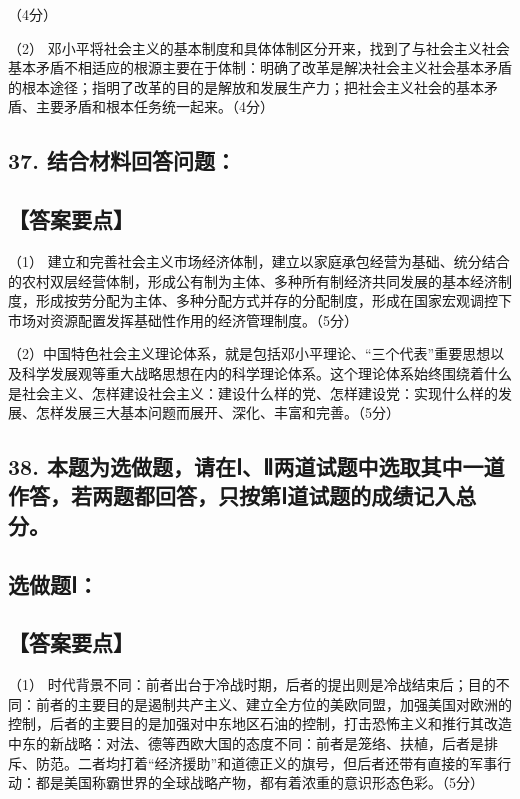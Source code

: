 \documentclass[UTF8,11pt]{ctexart}
\begin{document}
（4分）


（2） 邓小平将社会主义的基本制度和具体体制区分开来，找到了与社会主义社会基本矛盾不相适应的根源主要在于体制：明确了改革是解决社会主义社会基本矛盾的根本途径；指明了改革的目的是解放和发展生产力；把社会主义社会的基本矛盾、主要矛盾和根本任务统一起来。（4分）


\subsection*{37. 结合材料回答问题：}

\subsection*{【答案要点】}

（1） 建立和完善社会主义市场经济体制，建立以家庭承包经营为基础、统分结合的农村双层经营体制，形成公有制为主体、多种所有制经济共同发展的基本经济制度，形成按劳分配为主体、多种分配方式并存的分配制度，形成在国家宏观调控下市场对资源配置发挥基础性作用的经济管理制度。（5分）


（2）中国特色社会主义理论体系，就是包括邓小平理论、“三个代表”重要思想以及科学发展观等重大战略思想在内的科学理论体系。这个理论体系始终围绕着什么是社会主义、怎样建设社会主义：建设什么样的党、怎样建设党：实现什么样的发展、怎样发展三大基本问题而展开、深化、丰富和完善。（5分）


\subsection*{38. 本题为选做题，请在Ⅰ、Ⅱ两道试题中选取其中一道作答，若两题都回答，只按第Ⅰ道试题的成绩记入总分。}

\subsection*{选做题Ⅰ：}

\subsection*{【答案要点】}

（1） 时代背景不同：前者出台于冷战时期，后者的提出则是冷战结束后；目的不同：前者的主要目的是遏制共产主义、建立全方位的美欧同盟，加强美国对欧洲的控制，后者的主要目的是加强对中东地区石油的控制，打击恐怖主义和推行其改造中东的新战略：对法、德等西欧大国的态度不同：前者是笼络、扶植，后者是排斥、防范。二者均打着“经济援助”和道德正义的旗号，但后者还带有直接的军事行动：都是美国称霸世界的全球战略产物，都有着浓重的意识形态色彩。（5分）
\end{document}
